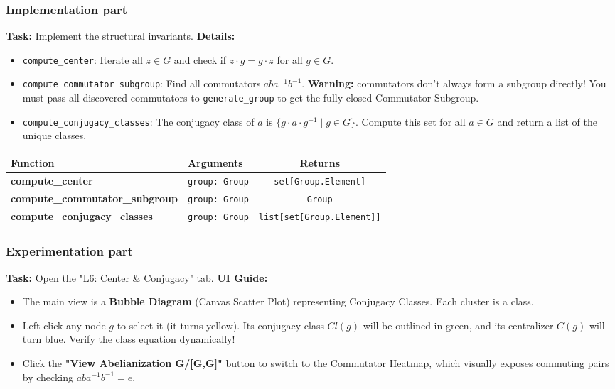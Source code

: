 \documentclass[11pt]{article}
\begin{document}
\subsubsection*{Implementation part}
\textbf{Task:} Implement the structural invariants.
\textbf{Details:}
\begin{itemize}
    \item \lstinline|compute_center|: Iterate all $z \in G$ and check if $z \cdot g = g \cdot z$ for all $g \in G$.
    \item \lstinline|compute_commutator_subgroup|: Find all commutators $aba^{-1}b^{-1}$. \textbf{Warning:} commutators don't always form a subgroup directly! You must pass all discovered commutators to \lstinline|generate_group| to get the fully closed Commutator Subgroup.
    \item \lstinline|compute_conjugacy_classes|: The conjugacy class of $a$ is $\{g \cdot a \cdot g^{-1} \mid g \in G\}$. Compute this set for all $a \in G$ and return a list of the unique classes.
\end{itemize}
\begin{center}
\renewcommand{\arraystretch}{1.5}
\begin{tabularx}{\textwidth}{@{} >{\bfseries}l X c @{}}
\toprule
Function & Arguments & Returns \\ \midrule
compute\_center & \lstinline|group: Group| & \lstinline|set[Group.Element]| \\
compute\_commutator\_subgroup & \lstinline|group: Group| & \lstinline|Group| \\
compute\_conjugacy\_classes & \lstinline|group: Group| & \lstinline|list[set[Group.Element]]| \\
\bottomrule
\end{tabularx}
\end{center}

\subsubsection*{Experimentation part}
\textbf{Task:} Open the "L6: Center \& Conjugacy" tab.
\textbf{UI Guide:} 
\begin{itemize}
    \item The main view is a \textbf{Bubble Diagram} (Canvas Scatter Plot) representing Conjugacy Classes. Each cluster is a class.
    \item Left-click any node $g$ to select it (it turns yellow). Its conjugacy class $Cl(g)$ will be outlined in green, and its centralizer $C(g)$ will turn blue. Verify the class equation dynamically!
    \item Click the \textbf{"View Abelianization G/[G,G]"} button to switch to the Commutator Heatmap, which visually exposes commuting pairs by checking $aba^{-1}b^{-1} = e$.
\end{itemize}
\end{document}
